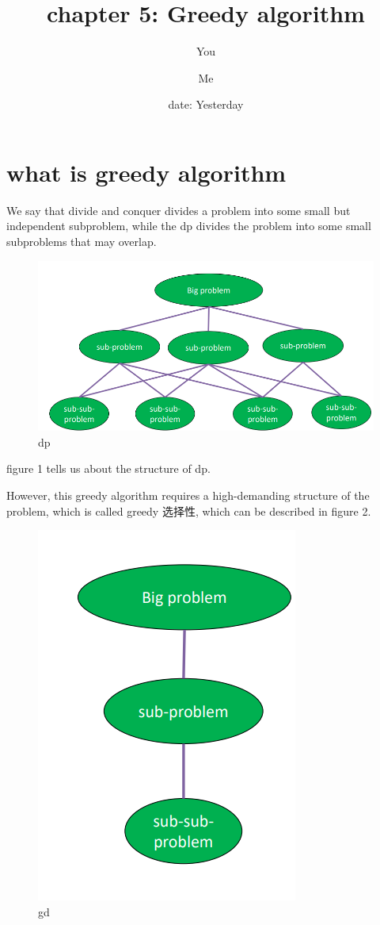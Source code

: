 \documentclass[a4paper, 10pt]{ctexart} %
\title{chapter 5: Greedy algorithm}
\author{You \and Me}
\date{date: Yesterday}
\begin{document}
\maketitle 
\tableofcontents
\section{what is greedy algorithm}
We say that divide and conquer divides a 
problem into some small 
but independent subproblem, while 
the dp divides the problem into some 
small subproblems that may overlap.
\begin{figure}
    \centering 
    \includegraphics[scale = 0.5]{gd1.png}
    \caption{dp}
\end{figure}
figure 1 tells us about the structure of dp.

However, this greedy algorithm requires a 
high-demanding structure of the problem, which is called 
greedy 选择性, which can be described in figure 2.
\begin{figure}
    \centering
    \includegraphics[scale = 0.5]{gd2.png}
    \caption{gd}
\end{figure}
\end{document}
